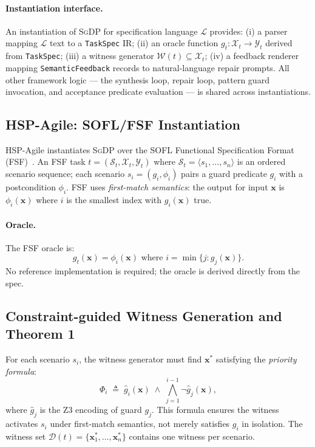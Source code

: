 \paragraph{Instantiation interface.}
An instantiation of \textsc{SgDP} for specification language $\mathcal{L}$ provides:
(i) a parser mapping $\mathcal{L}$ text to a \texttt{TaskSpec} IR;
(ii) an oracle function $g_t: \mathcal{X}_t \to \mathcal{Y}_t$ derived from
\texttt{TaskSpec};
(iii) a witness generator $\mathcal{W}(t) \subseteq \mathcal{X}_t$;
(iv) a feedback renderer mapping \texttt{SemanticFeedback} records to natural-language
repair prompts.
All other framework logic — the synthesis loop, repair loop, pattern guard invocation,
and acceptance predicate evaluation — is shared across instantiations.

\subsection{HSP-Agile: SOFL/FSF Instantiation}
\label{subsec:hsp-agile}

HSP-Agile instantiates \textsc{SgDP} over the SOFL Functional Specification Format
(FSF)~\cite{liu2004soflbook,li2022qrs_companion}.
An FSF task $t = (\mathcal{S}_t, \mathcal{X}_t, \mathcal{Y}_t)$ where
$\mathcal{S}_t = \langle s_1, \ldots, s_n \rangle$ is an ordered scenario sequence;
each scenario $s_i = (g_i, \phi_i)$ pairs a guard predicate $g_i$ with a postcondition
$\phi_i$.  FSF uses \emph{first-match semantics}: the output for input $\mathbf{x}$ is
$\phi_i(\mathbf{x})$ where $i$ is the smallest index with $g_i(\mathbf{x})$ true.

\paragraph{Oracle.}  The FSF oracle is:
\begin{equation}
  g_t(\mathbf{x}) = \phi_i(\mathbf{x}) \text{ where } i = \min\{j : g_j(\mathbf{x})\}.
\end{equation}
No reference implementation is required; the oracle is derived directly from the spec.

\subsection{Constraint-guided Witness Generation and Theorem 1}
\label{subsec:witness-gen}

For each scenario $s_i$, the witness generator must find $\mathbf{x}^*$ satisfying
the \emph{priority formula}:
\begin{equation}
  \label{eq:priority}
  \Phi_i \;\triangleq\; \hat{g}_i(\mathbf{x}) \;\land\; \bigwedge_{j=1}^{i-1} \lnot\hat{g}_j(\mathbf{x}),
\end{equation}
where $\hat{g}_j$ is the Z3 encoding of guard $g_j$.  This formula ensures the witness
activates $s_i$ under first-match semantics, not merely satisfies $g_i$ in isolation.
The witness set $\mathcal{D}(t) = \{\mathbf{x}_1^*, \ldots, \mathbf{x}_n^*\}$ contains
one witness per scenario.

